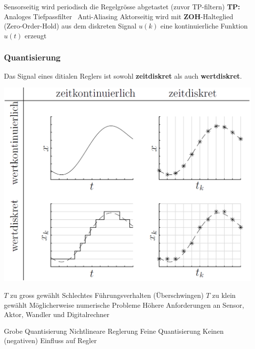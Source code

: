 \begin{outline}
    \1 Sensorseitig wird periodisch die Regelgrösse abgetastet (zuvor TP-filtern)
        \2 \textbf{TP:} Analoges Tiefpassfilter \textrightarrow\ Anti-Aliasing
    \1 Aktorseitig wird mit \textbf{ZOH}-Halteglied (Zero-Order-Hold) aus dem diskreten Signal $u(k)$ eine kontinuierliche Funktion $u(t)$ erzeugt 
\end{outline}


\subsubsection{Quantisierung}

 Das Signal eines ditialen Reglers ist sowohl \textbf{zeitdiskret} als auch \textbf{wertdiskret}.
 \vspace{0.2cm}

\begin{minipage}[c]{0.4\columnwidth}
    \includegraphics[width=\columnwidth]{images/abtastung.png}
\end{minipage}
\hfill
\begin{minipage}[c]{0.58\columnwidth}

    \textbf{}

    \begin{outline}
        \1 $T$ zu gross gewählt
            \2 Schlechtes Führungsverhalten (Überschwingen)
        \1 $T$ zu klein gewählt
            \2 Möglicherweise numerische Probleme
            \2 Höhere Anforderungen an Sensor, Aktor, Wandler und Digitalrechner
    \end{outline}


    \textbf{}

    \begin{outline}
        \1 Grobe Quantisierung
            \2 Nichtlineare Reglerung
        \1 Feine Quantisierung
            \2 Keinen (negativen) Einfluss auf Regler 
    \end{outline}
\end{minipage}


